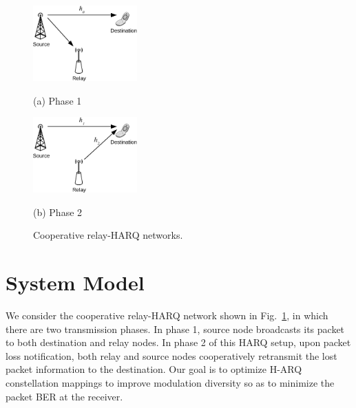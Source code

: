\documentclass[journal]{IEEEtran}
\begin{document}
\begin{figure}[!t]
    \begin{minipage}[b]{0.48\linewidth}
      \centering
      \centerline{\includegraphics[width=4.0cm]{./figs/relayHARQ1.eps}}
      \centerline{(a) Phase 1}\medskip
    \end{minipage}
    \hfill
    \begin{minipage}[b]{.48\linewidth}
      \centering
      \centerline{\includegraphics[width=4.0cm]{./figs/relayHARQ2.eps}}
      \centerline{(b) Phase 2}\medskip
    \end{minipage}
    \caption{Cooperative relay-HARQ networks.}
    \label{fig:system_model}
\end{figure}


\vspace*{-2mm}
\section{System Model}
\label{sec:model}
\vspace*{-2mm}
We consider the cooperative relay-HARQ network shown in
Fig.~\ref{fig:system_model}, in which there are two transmission phases.
In phase 1, source node broadcasts its packet to both destination and relay
nodes.
In phase 2 of this HARQ setup, upon packet loss notification, both relay and
source nodes cooperatively retransmit the lost packet information to the
destination. Our goal is to optimize H-ARQ constellation mappings to improve
modulation diversity so as to minimize the packet BER at the receiver.
\end{document}

